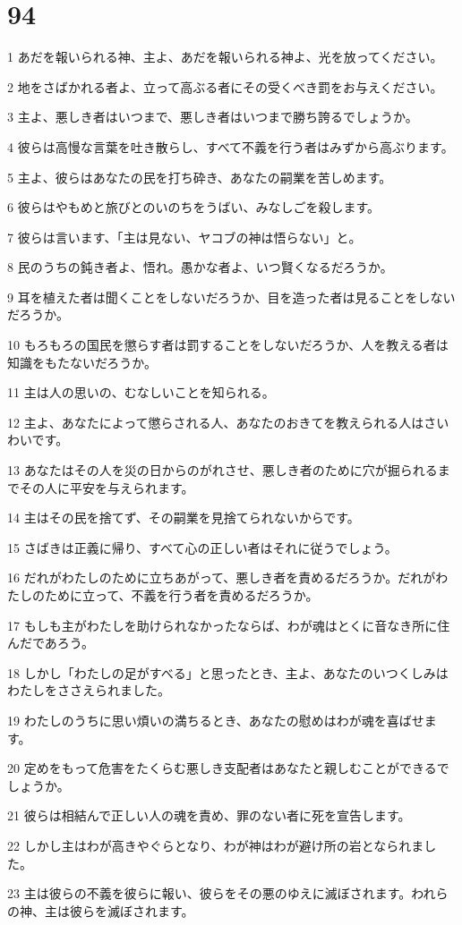 \chapter{94}

\par 1 あだを報いられる神、主よ、あだを報いられる神よ、光を放ってください。
\par 2 地をさばかれる者よ、立って高ぶる者にその受くべき罰をお与えください。
\par 3 主よ、悪しき者はいつまで、悪しき者はいつまで勝ち誇るでしょうか。
\par 4 彼らは高慢な言葉を吐き散らし、すべて不義を行う者はみずから高ぶります。
\par 5 主よ、彼らはあなたの民を打ち砕き、あなたの嗣業を苦しめます。
\par 6 彼らはやもめと旅びとのいのちをうばい、みなしごを殺します。
\par 7 彼らは言います、「主は見ない、ヤコブの神は悟らない」と。
\par 8 民のうちの鈍き者よ、悟れ。愚かな者よ、いつ賢くなるだろうか。
\par 9 耳を植えた者は聞くことをしないだろうか、目を造った者は見ることをしないだろうか。
\par 10 もろもろの国民を懲らす者は罰することをしないだろうか、人を教える者は知識をもたないだろうか。
\par 11 主は人の思いの、むなしいことを知られる。
\par 12 主よ、あなたによって懲らされる人、あなたのおきてを教えられる人はさいわいです。
\par 13 あなたはその人を災の日からのがれさせ、悪しき者のために穴が掘られるまでその人に平安を与えられます。
\par 14 主はその民を捨てず、その嗣業を見捨てられないからです。
\par 15 さばきは正義に帰り、すべて心の正しい者はそれに従うでしょう。
\par 16 だれがわたしのために立ちあがって、悪しき者を責めるだろうか。だれがわたしのために立って、不義を行う者を責めるだろうか。
\par 17 もしも主がわたしを助けられなかったならば、わが魂はとくに音なき所に住んだであろう。
\par 18 しかし「わたしの足がすべる」と思ったとき、主よ、あなたのいつくしみはわたしをささえられました。
\par 19 わたしのうちに思い煩いの満ちるとき、あなたの慰めはわが魂を喜ばせます。
\par 20 定めをもって危害をたくらむ悪しき支配者はあなたと親しむことができるでしょうか。
\par 21 彼らは相結んで正しい人の魂を責め、罪のない者に死を宣告します。
\par 22 しかし主はわが高きやぐらとなり、わが神はわが避け所の岩となられました。
\par 23 主は彼らの不義を彼らに報い、彼らをその悪のゆえに滅ぼされます。われらの神、主は彼らを滅ぼされます。

